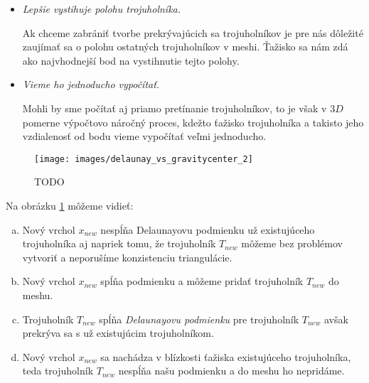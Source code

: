 \begin{enumerate}
{\begin{itemize}
{                Hlavný problém, prečo overovanie Delaunayovej podmienky pre všetky trojuholníky spôsobuje
                odmietanie aj vhodných trojuholníkov je ten, že stred opísanej kružnice nemusí byť vždy
                vnútri trojuholníka. Čím je trojuholník užší, tým je dokonca vzdialenejší a tak môže aj
                vzdialenejší úzky trojuholník spôsobiť nevzniknutie vhodného trojuholníka. 
            }
            \item{
                \textit{Lepšie vystihuje polohu trojuholníka.}

                Ak chceme zabrániť tvorbe prekrývajúcich sa trojuholníkov je pre nás dôležité zaujímať sa 
                o polohu ostatných trojuholníkov v meshi. Ťažisko sa nám zdá ako najvhodnejší bod na 
                vystihnutie tejto polohy.
            }
            \item{
                \textit{Vieme ho jednoducho vypočítať.}

                Mohli by sme počítať aj priamo pretínanie trojuholníkov, to je však v $3D$ pomerne 
                výpočtovo náročný proces, kdežto ťažisko trojuholníka a takisto jeho vzdialenosť od 
                bodu vieme vypočítať veľmi jednoducho.
            }
         \end{itemize}
         
         \begin{figure}
         \centerline{\texttt{[image: images/delaunay\_vs\_gravitycenter\_2]}}
         \caption[]{TODO}
         \label{obr:delaunay_vs_gravitycenter_2}
         \end{figure}
         
         Na obrázku \ref{obr:delaunay_vs_gravitycenter_2} môžeme vidieť:
         \begin{enumerate}[a)]
            \item{
                Nový vrchol $x_{new}$ nespĺňa Delaunayovu podmienku už existujúceho trojuholníka aj 
                napriek tomu, že trojuholník $T_{new}$ môžeme bez problémov vytvoriť a 
                neporušíme konzistenciu triangulácie.
            }
            \item{
                Nový vrchol $x_{new}$ spĺňa podmienku a môžeme pridať trojuholník $T_{new}$ do meshu.
            }
            \item{
                Trojuholník $T_{new}$ spĺňa \textit{Delaunayovu podmienku} pre trojuholník $T_{new}$ 
                avšak prekrýva sa s už existujúcim trojuholníkom.
            }
            \item{
                Nový vrchol $x_{new}$ sa nachádza v blízkosti ťažiska existujúceho trojuholníka, 
                teda trojuholník $T_{new}$ nespĺňa našu podmienku a do meshu ho nepridáme. 
            }
         \end{enumerate}


}
\end{enumerate}
